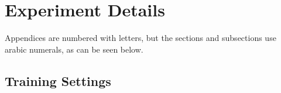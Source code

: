 \chapter{Experiment Details}
\label{app:n}
Appendices are numbered with letters, but the sections and subsections use
arabic numerals, as can be seen below.

\section{Training Settings}



